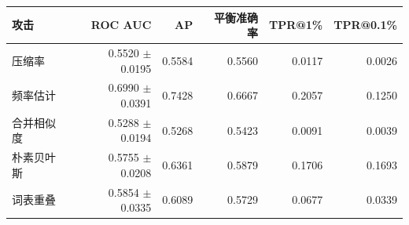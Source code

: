 \begin{tabular}{lrrrrr}
\toprule
攻击 & ROC AUC & AP & 平衡准确率 & TPR@1\% & TPR@0.1\% \\
\midrule
压缩率 & 0.5520 $\pm$ 0.0195 & 0.5584 & 0.5560 & 0.0117 & 0.0026 \\
频率估计 & 0.6990 $\pm$ 0.0391 & 0.7428 & 0.6667 & 0.2057 & 0.1250 \\
合并相似度 & 0.5288 $\pm$ 0.0194 & 0.5268 & 0.5423 & 0.0091 & 0.0039 \\
朴素贝叶斯 & 0.5755 $\pm$ 0.0208 & 0.6361 & 0.5879 & 0.1706 & 0.1693 \\
词表重叠 & 0.5854 $\pm$ 0.0335 & 0.6089 & 0.5729 & 0.0677 & 0.0339 \\
\bottomrule
\end{tabular}
